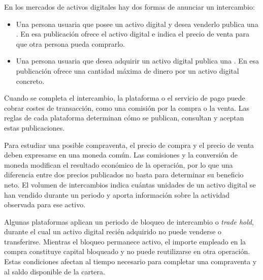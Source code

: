 En los mercados de activos digitales hay dos formas de anunciar un intercambio:
\begin{itemize}
    \item Una persona usuaria que posee un activo digital y desea venderlo publica una \textbf{}. En esa publicación ofrece el activo digital e indica el precio de venta para que otra persona pueda comprarlo.
    \item Una persona usuaria que desea adquirir un activo digital publica una \textbf{}. En esa publicación ofrece una cantidad máxima de dinero por un activo digital concreto.
\end{itemize}

Cuando se completa el intercambio, la plataforma o el servicio de pago puede cobrar costes de transacción, como una comisión por la compra o la venta. Las reglas de cada plataforma determinan cómo se publican, consultan y aceptan estas publicaciones.

Para estudiar una posible compraventa, el precio de compra y el precio de venta deben expresarse en una moneda común. Las comisiones y la conversión de moneda modifican el resultado económico de la operación, por lo que una diferencia entre dos precios publicados no basta para determinar su beneficio neto. El volumen de intercambios indica cuántas unidades de un activo digital se han vendido durante un periodo y aporta información sobre la actividad observada para ese activo.

Algunas plataformas aplican un periodo de bloqueo de intercambio o \textit{trade hold}, durante el cual un activo digital recién adquirido no puede venderse o transferirse. Mientras el bloqueo permanece activo, el importe empleado en la compra constituye capital bloqueado y no puede reutilizarse en otra operación. Estas condiciones afectan al tiempo necesario para completar una compraventa y al saldo disponible de la cartera.

